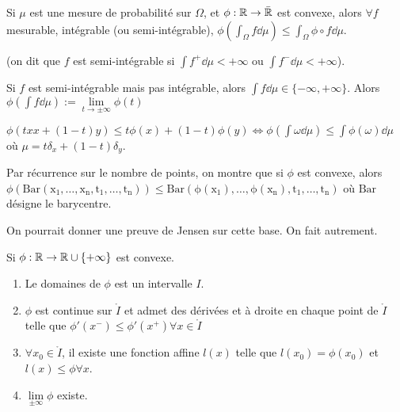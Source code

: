 \documentclass[10pt,a4paper,notitlepage ]{report}
\begin{document}
\begin{theorem}

Si $\mu$ est une mesure de probabilité sur $\Omega$, et $\phi : \mathbb R \rightarrow \bar{\mathbb R}$ est convexe, alors $\forall f$ mesurable, intégrable (ou semi-intégrable), $\phi\left(\int_\Omega f \dd\mu\right) \le \int_\Omega \phi \circ f \dd\mu$.
\end{theorem}
(on dit que $f$ est semi-intégrable si $\int f^+ \dd\mu < +\infty$ ou $\int f^- \dd\mu < + \infty$).
\begin{rem}
	Si $f$ est semi-intégrable mais pas intégrable, alors $\int f\dd\mu \in \{-\infty, + \infty\}$. Alors $\phi\left(\int f\dd\mu\right) := \underset{t\rightarrow \pm\infty} \lim \phi(t)$
\end{rem}
\begin{rem}
	$\phi(txx+(1-t)y) \le t\phi(x)+(1-t)\phi(y) \Leftrightarrow \phi\left(\int \omega \dd\mu\right) \le \int \phi(\omega)\dd\mu$ où $\mu = t\delta_x + (1-t)\delta_y$.
	
	Par récurrence sur le nombre de points, on montre que si $\phi$ est convexe, alors $\phi(\mathrm{Bar(x_1, \dots, x_n, t_1, \dots, t_n)}) \le \mathrm{Bar(\phi(x_1), \dots, \phi(x_n), t_1, \dots, t_n)}$ où $\mathrm{Bar}$ désigne le barycentre.
	
	On pourrait donner une preuve de Jensen sur cette base. On fait autrement.
\end{rem}
\begin{propriete}
	Si $\phi : \mathbb R \rightarrow \mathbb R\cup\{+\infty\}$ est convexe.
	\begin{enumerate}
		\item Le domaines de $\phi$ est un intervalle $I$.
		\item $\phi$ est continue sur $\mathring I$ et admet des dérivées et à droite en chaque point de $\mathring I$ telle que $\phi'(x^-) \le \phi'(x^+) \forall x\in \mathring I$
		\item $\forall x_0 \in \mathring I$, il existe une fonction affine $l(x)$ telle que $l(x_0) = \phi(x_0)$ et $l(x) \le \phi \forall x$.
		\item $\underset{\pm \infty} \lim \phi$ existe.
	\end{enumerate}
\end{propriete}
\end{document}
